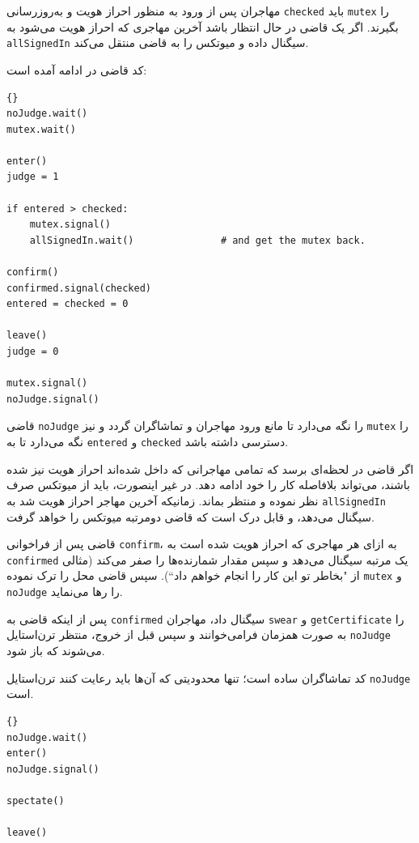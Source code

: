 \documentclass{book}
\begin{document}
    مهاجران پس از ورود به منظور احراز هویت و به‌روزرسانی {\tt checked} باید  {\tt mutex} را بگیرند. اگر یک قاضی در حال انتظار باشد  آخرین مهاجری 
    که احراز هویت می‌شود به  {\tt allSignedIn} سیگنال داده و میوتکس را به قاضی منتقل می‌کند. 

    کد قاضی در ادامه آمده است: 

\begin{latin}
\begin{lstlisting}[title=\rl{راهنمایی مسأله تالار \lr{Faneuil} (قاضی)}]{}
noJudge.wait()
mutex.wait()

enter()
judge = 1

if entered > checked:
    mutex.signal()
    allSignedIn.wait()               # and get the mutex back.

confirm()
confirmed.signal(checked)
entered = checked = 0

leave()
judge = 0

mutex.signal()
noJudge.signal()
\end{lstlisting}
\end{latin}

    قاضی {\tt noJudge} را نگه می‌دارد تا مانع ورود مهاجران و تماشاگران گردد و نیز {\tt mutex} را نگه می‌دارد تا به {\tt entered} و  {\tt checked}
    دسترسی داشته باشد. 

    اگر قاضی در لحظه‌ای برسد که تمامی مهاجرانی که داخل شده‌اند احراز هویت نیز شده باشند، می‌تواند بلافاصله کار را  خود ادامه دهد. 
    در غیر اینصورت، باید از میوتکس صرف نظر نموده و منتظر بماند. زمانیکه آخرین مهاجر احراز هویت شد به  {\tt allSignedIn} سیگنال می‌دهد، 
    و قابل درک است که قاضی دومرتبه میوتکس را خواهد گرفت. 
    

    قاضی پس از فراخوانی {\tt confirm}، به ازای هر مهاجری که احراز هویت شده است به  {\tt confirmed}   یک مرتبه سیگنال می‌دهد و سپس 
    مقدار شمارنده‌ها را صفر می‌کند (مثالی از "بخاطر تو این کار را انجام خواهم داد``).
    سپس قاضی محل را ترک نموده {\tt mutex} و {\tt noJudge}  را رها می‌نماید. 

    پس از اینکه قاضی به {\tt confirmed} سیگنال داد، مهاجران {\tt swear} و {\tt getCertificate} را به صورت همزمان فرامی‌خوانند و سپس 
    قبل از خروج، منتظر ترن‌استایل {\tt noJudge} می‌شوند که باز شود. 

    کد تماشاگران ساده است؛ تنها محدودیتی که  آن‌ها باید رعایت کنند ترن‌استایل  {\tt noJudge} است.

\begin{latin}
\begin{lstlisting}[title=\rl{راهنمایی مسأله تالار \lr{Faneuil} (تماشاگر)}]{}
noJudge.wait()
enter()
noJudge.signal()

spectate()

leave()
\end{lstlisting}
\end{latin}
\end{document}
